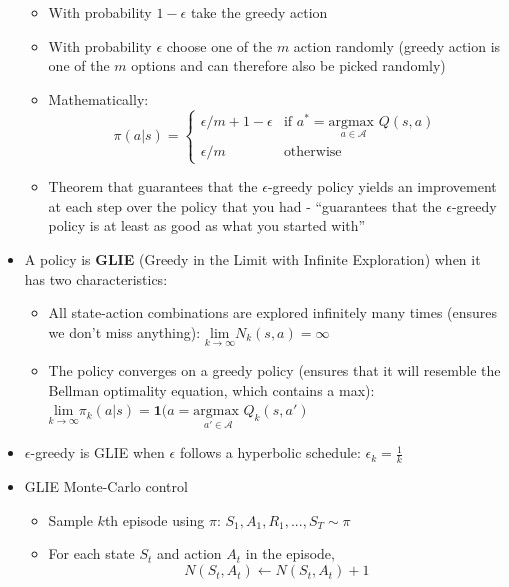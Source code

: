 \documentclass{article}
\begin{document}
\begin{itemize}
\begin{itemize}
        \item With probability $1-\epsilon$ take the greedy action
        \item With probability $\epsilon$ choose one of the $m$ action randomly (greedy action is one of the $m$ options and can therefore also be picked randomly) 
        \item Mathematically:
        \begin{equation}
            \pi(a|s)=
            \begin{cases}
                \epsilon/m+1-\epsilon & \text{if } a^*=\underset{a \in \mathcal{A}}{\text{argmax }} Q(s, a) \\
                \epsilon/m & \text{otherwise}
            \end{cases}
        \end{equation}
        \item Theorem that guarantees that the $\epsilon$-greedy policy yields an improvement at each step over the policy that you had - ``guarantees that the $\epsilon$-greedy policy is at least as good as what you started with''
    \end{itemize}
    \item A policy is \textbf{GLIE} (Greedy in the Limit with Infinite Exploration) when it has two characteristics:
    \begin{itemize}
        \item All state-action combinations are explored infinitely many times (ensures we don't miss anything): $\underset{k\rightarrow \infty}{\text{lim}}N_k(s, a)=\infty$
        \item The policy converges on a greedy policy (ensures that it will resemble the Bellman optimality equation, which contains a max): $\underset{k\rightarrow \infty}{\text{lim}}\pi_k(a|s)=\textbf{1}(a=\underset{a' \in \mathcal{A}}{\text{argmax }} Q_k(s, a')$
    \end{itemize}
    \item $\epsilon$-greedy is GLIE when $\epsilon$ follows a hyperbolic schedule: $\epsilon_k=\frac{1}{k}$
    \item GLIE Monte-Carlo control
    \begin{itemize}
        \item Sample $k$th episode using $\pi$: $S_1, A_1,R_1, ..., S_T \sim \pi$
        \item For each state $S_t$ and action $A_t$ in the episode,
            \begin{equation*}
                N(S_t, A_t) \leftarrow N(S_t, A_t) + 1

\end{equation*}
\end{itemize}
\end{itemize}
\end{document}
